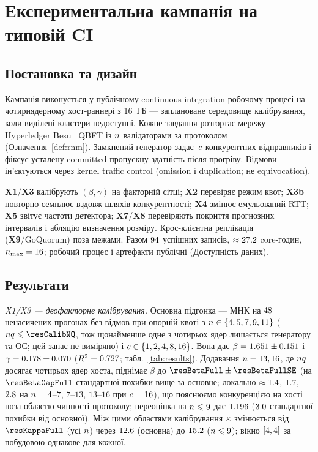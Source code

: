 \section{Експериментальна кампанія на типовій CI}
\label{sec:exp}

\subsection{Постановка та дизайн}

Кампанія виконується у публічному continuous-integration робочому процесі на
чотириядерному хост-раннері з 16~ГБ --- заплановане середовище калібрування, коли
виділені кластери недоступні. Кожне завдання розгортає мережу Hyperledger
Besu~\cite{besu} QBFT із
$n$ валідаторами за протоколом \RNM{} (Означення~\ref{def:rnm}). Замкнений
генератор задає~$c$ конкурентних відправників і фіксує усталену committed
пропускну здатність після прогріву. Відмови ін'єктуються через kernel traffic
control (omission і duplication; не equivocation).

\textbf{X1}/\textbf{X3} калібрують $(\beta,\gamma)$ на факторній сітці;
\textbf{X2} перевіряє режим квот; \textbf{X3b} повторно семплює вздовж шляхів
конкурентності; \textbf{X4} змінює емульований RTT; \textbf{X5} звітує частоти
детектора; \textbf{X7}/\textbf{X8} перевіряють покриття прогнозних інтервалів і
абляцію визначення розміру. Крос-клієнтна реплікація (\textbf{X9}/GoQuorum) поза
межами. Разом $94$ успішних записів,
$\approx27.2$ core-годин, $\n_{\max}=\resNmaxMeasured$; робочий процес
і артефакти публічні (Доступність даних).

\subsection{Результати}

\emph{X1/X3 --- двофакторне калібрування.}
Основна підгонка --- МНК на $48$ ненасичених прогонах без відмов при
опорній квоті з $n\in\{4,5,7,9,11\}$ ($\n\q\le\resCalibNQ$, тож щонайменше одне
з чотирьох ядер лишається генератору та ОС; цей запас не виміряно) і
$c\in\{1,2,4,8,16\}$. Вона дає
$\beta=1.651\pm0.151$ і $\gamma=0.178\pm0.070$
($R^{2}=0.727$; табл.~\ref{tab:results}). Додавання $n=13,16$, де $nq$
досягає чотирьох ядер хоста, піднімає $\beta$ до
$\resBetaFull\pm\resBetaFullSE$ (на $\resBetaGapFull$ стандартної похибки вище
за основне; локально $\approx1.4$, $1.7$, $2.8$
на $n=4$--$7$, $7$--$13$, $13$--$16$ при $c=16$), що пояснюємо конкуренцією
на хості поза областю чинності протоколу; переоцінка на $n\leqslant9$
дає $1.196$ ($3.0$ стандартної похибки від основної).
Між цими областями калібрування $\kappa$ змінюється від $\resKappaFull$
(усі $n$) через $12.6$ (основна) до $15.2$
($n\leqslant9$); вікно $[4,4]$ за побудовою
однакове для кожної.

